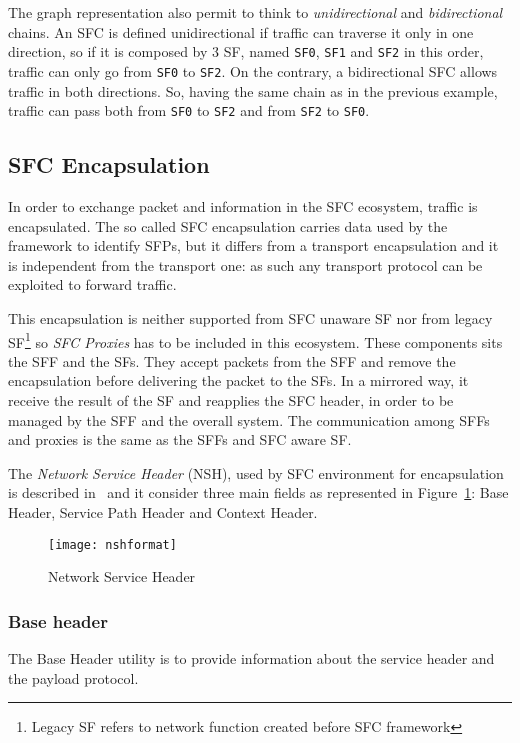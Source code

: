 The graph representation also permit to think to \emph{unidirectional} and
\emph{bidirectional} chains. An SFC is defined unidirectional if traffic can
traverse it only in one direction, so if it is composed by 3 SF, named
\texttt{SF0}, \texttt{SF1} and \texttt{SF2} in this order, traffic can only go
from \texttt{SF0} to \texttt{SF2}. On the contrary, a bidirectional SFC allows
traffic in both directions. So, having the same chain as in the previous
example, traffic can pass both from \texttt{SF0} to \texttt{SF2} and from
\texttt{SF2} to \texttt{SF0}.

\subsection{SFC Encapsulation}
In order to exchange packet and information in the SFC ecosystem, traffic is
encapsulated. The so called SFC encapsulation carries data used by the
framework to identify SFPs, but it differs from a transport encapsulation and it
is independent from the transport one: as such any transport protocol can be
exploited to forward traffic.

This encapsulation is neither supported from SFC unaware SF nor from legacy 
SF\footnote{Legacy SF refers to network function created before SFC framework}
so \emph{SFC Proxies} has to be included in this ecosystem. These components
sits the SFF and the SFs. They accept packets from the SFF and remove the
encapsulation before delivering the packet to the SFs. In a mirrored way, it
receive the result of the SF and reapplies the SFC header, in order to be
managed by the SFF and the overall system. The communication among SFFs and
proxies is the same as the SFFs and SFC aware SF.

The \emph{Network Service Header} (NSH), used by SFC environment for
encapsulation is described in~\cite{rfc8300} and it consider three main fields
as represented in Figure~\ref{chap:background:img:nshformat}: Base Header,
Service Path Header and Context Header.
\begin{figure}[H]
  \centering
  \texttt{[image: nshformat]}
  \caption[Network Service Header]{Network Service Header~\cite{rfc8300}}
  \label{chap:background:img:nshformat}
\end{figure}

\subsubsection{Base header}
The Base Header utility is to provide information about the service header and
the payload protocol.

